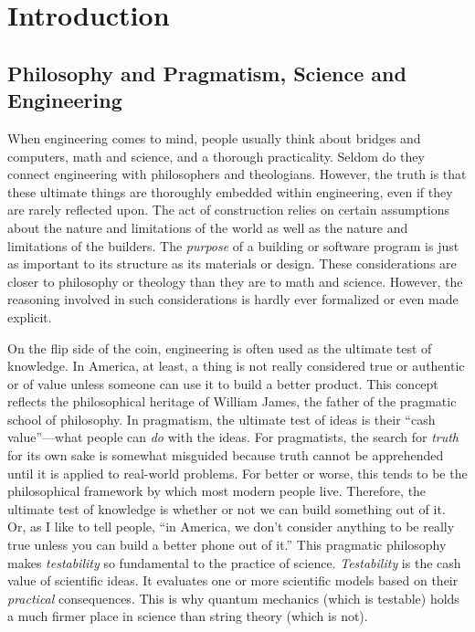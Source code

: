 \chapter{Introduction}

\section{Philosophy and Pragmatism, Science and Engineering}

When engineering comes to mind, people usually think about bridges and computers, math and science, and a thorough practicality.  Seldom do they connect engineering with philosophers and theologians. However, the truth is that these ultimate things are thoroughly embedded within engineering, even if they are rarely reflected upon.  
The act of construction relies on certain assumptions about the nature and limitations of the world as well as the nature and limitations of the builders.  
The \textit{purpose} of a building or software program is just as important to its structure as its materials or design. 
These considerations are closer to philosophy or theology than they are to math and science.  However, the reasoning involved in such considerations is hardly ever
formalized or even made explicit.

On the flip side of the coin, engineering is often used as the ultimate test of knowledge.  %
In America, at least, a thing is not really considered true or authentic or of value unless someone can use it to build a better product.  
This concept reflects the philosophical heritage of William James, the father of the pragmatic school of philosophy.  In pragmatism, the ultimate test of ideas is their ``cash value''---what people can \textit{do} with the ideas.  For pragmatists, the search for \textit{truth} for its own sake is somewhat misguided because truth cannot be apprehended until it is applied to real-world problems.  For better or worse, this tends to be the philosophical framework by which most modern people live.  Therefore, the ultimate test of knowledge is whether or not we can build something out of it.  Or, as I like to tell people, ``in America, we don't consider anything to be really true unless you can build a better phone out of it.''  This pragmatic philosophy makes \textit{testability} so fundamental to the practice of science.  \textit{Testability} is the cash value of scientific ideas.  It evaluates one or more scientific models based on their \textit{practical} consequences.  This is why quantum mechanics (which is testable) holds a much firmer place in science than string theory (which is not). 

